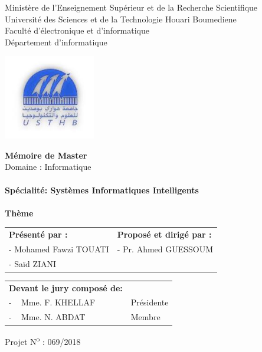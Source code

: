 \documentclass[12pt , a4paper]{report}
\begin{document}
\begin{center}
\normalsize{Ministère de l'Enseignement Supérieur et de la Recherche Scientifique}\\
\normalsize{Université des Sciences et de la Technologie Houari Boumediene}\\
\normalsize{Faculté d'électronique et d'informatique}\\
\normalsize{Département d'informatique}\\
\end{center}
\begin{center}
\includegraphics[width=4cm,height=3.7cm]{usthb.jpg}
\end{center}


\begin{center}
\Huge{\textbf{Mémoire de Master}}\\
\large{Domaine : Informatique}\\
\textbf{}\\
\large{\textbf{Spécialité: Systèmes Informatiques Intelligents}}\\
\textbf{}\\
\bigskip
\vspace*{1cm}
\normalsize{\textbf{Thème}}
\end{center}
\vspace*{1.5cm}

\begin{table}[h]
\center
\begin{tabular}{p{8cm}p{6.5cm}}
\textbf{Présenté par :} & \textbf{Proposé et dirigé par :}\\
- Mohamed Fawzi TOUATI  & -	Pr. Ahmed GUESSOUM\\
- Saïd ZIANI\\
\end{tabular}
\end{table}

\vspace*{0.5cm}

\begin{table}[h]
\begin{tabular}{p{6.5cm}p{5cm}}
\textbf{Devant le jury composé de:}&\\
- \,\,\, Mme. F. KHELLAF & Présidente \\
- \,\,\, Mme. N. ABDAT & Membre \\
\end{tabular}
\end{table}
\vspace*{2.7cm}
\begin{center}
Projet N\textsuperscript{o} : 069/2018
\end{center}
\end{document}
